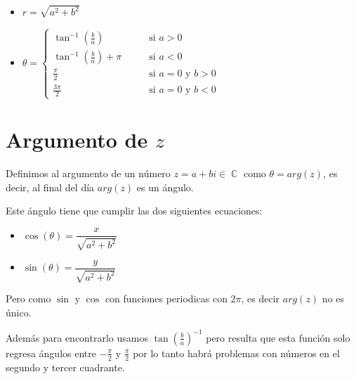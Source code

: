 \documentclass[12pt, fleqn]{report}                             %
\DeclareMathOperator \Space {\quad}                             %
\newcommand{\Wrap}[1]{\left( #1 \right)}                        %
\DeclareMathOperator \Complexs  {\mathbb{C}}                     %
\newcommand{\Cos}[1]{\cos\Wrap{#1}}                             %
\newcommand{\Sin}[1]{\sin\Wrap{#1}}                             %
\begin{document}
                \begin{itemize}
                    \item $r = \sqrt{a^2+b^2}$
                    \item $\theta = \begin{cases}
                                        \tan^{-1}(\frac{b}{a})          \Space &\text{ si } a > 0                  \\
                                        \tan^{-1}(\frac{b}{a})+\pi      \Space &\text{ si } a < 0                  \\
                                        \frac{\pi}{2}                   \Space &\text{ si } a = 0 \text{ y } b > 0 \\
                                        \frac{3\pi}{2}                  \Space &\text{ si } a = 0 \text{ y } b < 0 
                                    \end{cases}$
                \end{itemize}

        \clearpage
        \section{Argumento de $z$}
            
            Definimos al argumento de un número $z = a+bi \in \Complexs$ como $\theta = arg(z)$,
            es decir, al final del día $arg(z)$ es un ángulo.

            Este ángulo tiene que cumplir las dos siguientes ecuaciones:

            \begin{itemize}
                \item $\Cos{\theta} = \dfrac{x}{\sqrt{a^2+b^2}}$
                \item $\Sin{\theta}   = \dfrac{y}{\sqrt{a^2+b^2}}$
            \end{itemize}

            Pero como $\sin$ y $\cos$ con funciones periodicas con $2\pi$, es decir $arg(z)$ no es único.

            Además para encontrarlo usamos $\tan(\frac{b}{a})^{-1}$ pero resulta que esta función solo
            regresa ángulos entre $-\frac{\pi}{2}$ y $\frac{\pi}{2}$ por lo tanto habrá problemas con
            números en el segundo y tercer cuadrante.
\end{document}
